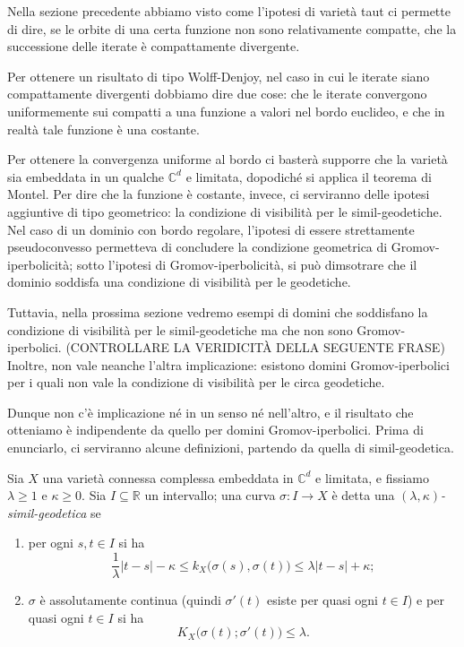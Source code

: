 Nella sezione precedente abbiamo visto come l'ipotesi di varietà taut ci permette di dire, se le orbite di una certa funzione non sono relativamente compatte, che la successione delle iterate è compattamente divergente.

Per ottenere un risultato di tipo Wolff-Denjoy, nel caso in cui le iterate siano compattamente divergenti dobbiamo dire due cose: che le iterate convergono uniformemente sui compatti a una funzione a valori nel bordo euclideo, e che in realtà tale funzione è una costante.

Per ottenere la convergenza uniforme al bordo ci basterà supporre che la varietà sia embeddata in un qualche $\mathbb{C}^d$ e limitata, dopodiché si applica il teorema di Montel. Per dire che la funzione è costante, invece, ci serviranno delle ipotesi aggiuntive di tipo geometrico: la condizione di visibilità per le simil-geodetiche. \\

Nel caso di un dominio con bordo regolare, l'ipotesi di essere strettamente pseudoconvesso permetteva di concludere la condizione geometrica di Gromov-iperbolicità; sotto l'ipotesi di Gromov-iperbolicità, si può dimsotrare che il dominio soddisfa una condizione di visibilità per le geodetiche.

Tuttavia, nella prossima sezione vedremo esempi di domini che soddisfano la condizione di visibilità per le simil-geodetiche ma che non sono Gromov-iperbolici. (CONTROLLARE LA VERIDICITÀ DELLA SEGUENTE FRASE) Inoltre, non vale neanche l'altra implicazione: esistono domini Gromov-iperbolici per i quali non vale la condizione di visibilità per le circa geodetiche.

Dunque non c'è implicazione né in un senso né nell'altro, e il risultato che otteniamo è indipendente da quello per domini Gromov-iperbolici. Prima di enunciarlo, ci serviranno alcune definizioni, partendo da quella di simil-geodetica.

\begin{defn}
    Sia $X$ una varietà connessa complessa embeddata in $\mathbb{C}^d$ e limitata, e fissiamo $\lambda \ge 1$ e $\kappa \ge 0$. Sia $I\subseteq \mathbb{R}$ un intervallo; una curva $\sigma:I \longrightarrow X$ è detta una \textit{$(\lambda,\kappa)$-simil-geodetica} se
    \begin{enumerate}
        \item per ogni $s,t \in I$ si ha
        $$\frac{1}{\lambda}|t-s|-\kappa \le k_X\big(\sigma(s),\sigma(t)\big)\le\lambda|t-s|+\kappa;$$
        \item $\sigma$ è assolutamente continua (quindi $\sigma'(t)$ esiste per quasi ogni $t \in I$) e per quasi ogni $t \in I$ si ha
        $$K_X\big(\sigma(t);\sigma'(t)\big) \le \lambda.$$
    \end{enumerate}
\end{defn}


